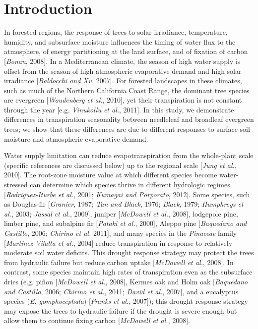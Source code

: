 \section{Introduction}

In forested regions, the response of trees to solar irradiance, temperature, humidity, and subsurface moisture influences the timing of water flux to the atmosphere, of energy partitioning at the land surface, and of fixation of carbon [\textit{Bonan}, 2008]. In a Mediterranean climate, the season of high water supply is offset from the season of high atmospheric evaporative demand and high solar irradiance [\textit{Baldocchi and Xu}, 2007]. For forested landscapes in these climates, such as much of the Northern California Coast Range, the dominant tree species are evergreen [\textit{Woudenberg et al.}, 2010], yet their transpiration is not constant through the year [e.g. \textit{Vinukollu et al.}, 2011].  In this study, we demonstrate differences in transpiration seasonality between needleleaf and broadleaf evergreen trees; we show that these differences are due to different responses to surface soil moisture and atmospheric evaporative demand.

Water supply limitation can reduce evapotranspiration from the whole-plant scale (specific references are discussed below) up to the regional scale [\textit{Jung et al.}, 2010].  The root-zone moisture value at which different species become water-stressed can determine which species thrive in different hydrologic regimes [\textit{Rodriguez-Iturbe et al.}, 2001; \textit{Kumagai and Porporato}, 2012].  Some species, such as Douglas-fir [\textit{Granier}, 1987; \textit{Tan and Black}, 1976; \textit{Black}, 1979; \textit{Humphreys et al.}, 2003; \textit{Jassal et al.}, 2009], juniper [\textit{McDowell et al.}, 2008], lodgepole pine, limber pine, and subalpine fir [\textit{Pataki et al.}, 2000], Aleppo pine [\textit{Baquedano and Castillo}, 2006; \textit{Chirino et al.} 2011], and many species in the \textit{Pinaceae} family [\textit{Mart\'inez-Vilalta et al.}, 2004] reduce transpiration in response to relatively moderate soil water deficits.  This drought response strategy may protect the trees from hydraulic failure but reduce carbon uptake [\textit{McDowell et al.}, 2008].  In contrast, some species maintain high rates of transpiration even as the subsurface dries (e.g. pi\~non [\textit{McDowell et al.}, 2008], Kermes oak and Holm oak [\textit{Baquedano and Castillo}, 2006; \textit{Chirino et al.}, 2011; \textit{David et al.}, 2007], and a eucalyptus species (\textit{E. gomphocephala}) [\textit{Franks et al.}, 2007]); this drought response strategy may expose the trees to hydraulic failure if the drought is severe enough but allow them to continue fixing carbon [\textit{McDowell et al.}, 2008]. 

